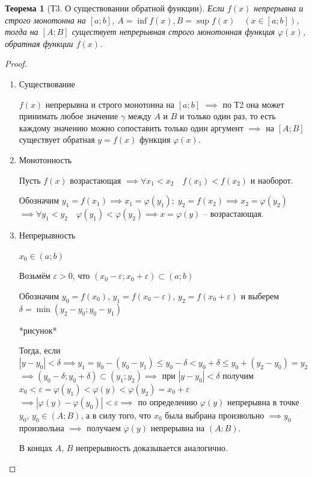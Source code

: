 \documentclass[a4paper,oneside]{article}
\newcommand{\eps}{\varepsilon}
\newtheorem{theorem}{Теорема}[subsection]
\theoremstyle{definition}
\theoremstyle{definition}
\theoremstyle{definition}
\begin{document}
\begin{theorem}[Т3. О существовании обратной функции]
    Если $f(x)$ непрерывна и строго монотонна на $[a; b]$, 
    $A = \inf f(x), B = \sup f(x) \quad (x \in [a; b])$,
    тогда на $[A; B]$ существует непрерывная строго монотонная функция
    $\varphi(x)$, обратная функции $f(x)$.
\end{theorem}
\begin{proof}
    \begin{enumerate}
        \item 
            Существование
        
            $f(x)$ непрерывна и строго монотонна на $[a; b]$ $\implies$ по Т2 она может
            принимать любое значение $\gamma$ между $A$ и $B$ и только один раз, то есть каждому
            значению можно сопоставить только один аргумент $\implies$ на $[A; B]$ существует
            обратная $y = f(x)$ функция $\varphi(x)$.

        \item
            Монотонность

            Пусть $f(x)$ возрастающая $\implies \forall x_1 < x_2 \quad f(x_1) < f(x_2)$ и наоборот.

            Обозначим $y_1 = f(x_1) \implies x_1 = \varphi(y_1); \; y_2 = f(x_2) \implies x_2 = \varphi(y_2)$
            $\implies \forall y_1 < y_2 \quad \varphi(y_1) < \varphi(y_2) \implies x = \varphi(y)$ -- возрастающая.
        
        \item
            Непрерывность

            $x_0 \in (a; b)$

            Возьмём $\eps > 0$, что $(x_0 - \eps; x_0 + \eps) \subset (a; b)$

            Обозначим $y_0 = f(x_0), \, y_1 = f(x_0 - \eps), \, y_2 = f(x_0 + \eps)$
            и выберем $\delta = \min (y_2 - y_0; y_0 - y_1)$

            *рисунок*

            Тогда, если $|y - y_0| < \delta \implies 
            y_1 = y_0 - (y_0 - y_1) \le y_0 - \delta < y_0 + \delta \le y_0 + (y_2 - y_0) = y_2$
            $\implies (y_0 - \delta; y_0 + \delta) \subset (y_1; y_2) \implies$ при
            $|y - y_0| < \delta$ получим $x_0 < \eps = \varphi(y_1) < \varphi(y) < \varphi(y_2) = x_0 + \eps$
            $\implies |\varphi(y) - \varphi(y_0)| < \eps \implies$ по определению $\varphi(y)$
            непрерывна в точке $y_0$, $y_0 \in (A; B)$, а в силу того, что $x_0$ была выбрана
            произвольно $\implies y_0$ произвольна $\implies$ получаем $\varphi(y)$ непрерывна на $(A; B)$.

            В концах $A$, $B$ непрерывность доказывается аналогично.
        \end{enumerate}
\end{proof}
\end{document}
